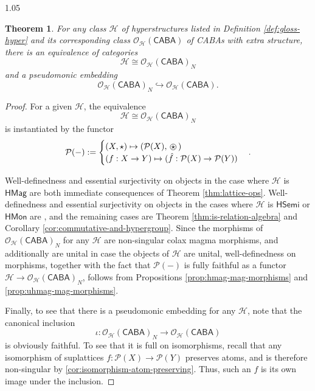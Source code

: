 \documentclass[reqno]{amsart}
\newcommand{\ostar}{%
  \mathbin{%
    \tikz[baseline=(s.base)]{
      \node (s) at (0,0) {$\star$};
      \draw[line width=0.4pt] (s.center) circle[radius=0.82ex];
    }%
  }%
}
\newcommand{\pow}{\mathcal{P}}
\newcommand{\cat}{\mathsf}
\numberwithin{equation}{section}
\theoremstyle{plain}
\newtheorem{theorem}[equation]{Theorem}
\theoremstyle{definition}
\begin{document}
\begin{spacing}{1.05}
\begin{theorem}
    For any class $\mathcal{H}$ of hyperstructures listed in Definition \ref{def:gloss-hyper} and its corresponding class $\mathcal{O}_\mathcal{H}(\cat{CABA})$ of CABAs with extra structure, there is an equivalence of categories $$\mathcal{H} \cong \mathcal{O}_\mathcal{H}(\cat{CABA})_N$$ and a pseudomonic embedding $$ \mathcal{O}_\mathcal{H}(\cat{CABA})_N \hookrightarrow \mathcal{O}_\mathcal{H}(\cat{CABA}).$$
\end{theorem}

\begin{proof} For a given $\mathcal{H}$, the equivalence $$ \mathcal{H} \cong \mathcal{O}_\mathcal{H}(\cat{CABA})_N$$ is instantiated by the functor $$\pow(-) := \begin{cases}
        (X, \star) \mapsto (\pow(X), \ostar) \\
        (f: X \to Y) \mapsto (\hat{f} : \pow(X) \to \pow(Y))
    \end{cases}.$$
    
    Well-definedness and essential surjectivity on objects in the case where $\mathcal{H}$ is $\cat{HMag}$ are both immediate consequences of Theorem \ref{thm:lattice-ops}. Well-definedness and essential surjectivity on objects in the cases where $\mathcal{H}$ is $\cat{HSemi}$ or $\cat{HMon}$ are \cite[N.8, N.11]{Dudzik_2016}, and the remaining cases are Theorem \ref{thm:is-relation-algebra} and Corollary \ref{cor:commutative-and-hypergroup}. Since the morphisms of $\mathcal{O}_\mathcal{H}(\cat{CABA})_N$ for any $\mathcal{H}$ are non-singular colax magma morphisms, and additionally are unital in case the objects of $\mathcal{H}$ are unital, well-definedness on morphisms, together with the fact that $\pow(-)$ is fully faithful as a functor $\mathcal{H} \to \mathcal{O}_\mathcal{H}(\cat{CABA})_N$, follows from Propositions \ref{prop:hmag-mag-morphisms} and \ref{prop:uhmag-mag-morphisms}.
    
    Finally, to see that there is a pseudomonic embedding for any $\mathcal{H}$, note that the canonical inclusion $$\iota: \mathcal{O}_\mathcal{H}(\cat{CABA})_N \to \mathcal{O}_\mathcal{H}(\cat{CABA})$$ is obviously faithful. To see that it is full on isomorphisms, recall that any isomorphism of suplattices $f : \pow(X) \to \pow(Y)$ preserves atoms, and is therefore non-singular by \ref{cor:isomorphism-atom-preserving}. Thus, such an $f$ is its own image under the inclusion.
\end{proof}




\end{spacing}
\end{document}
